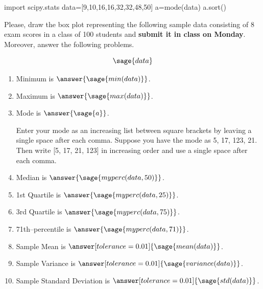 \documentclass{ximera}
\begin{document}
\begin{problem}
\begin{sagesilent}
import scipy.stats
data=[9,10,16,16,32,32,48,50]
a=mode(data)
a.sort()
\end{sagesilent}
Please, draw the box plot representing the following sample data consisting of 8 exam scores in a class of 100 students and \textbf{submit it in class on Monday}. Moreover, answer the following problems.

$$\sage{data}$$


\begin{enumerate}
    \item Minimum is $\answer{\sage{min(data)}}$.
    \item Maximum is $\answer{\sage{max(data)}}$.
    \item Mode is $\answer{\sage{a}}$.
        \begin{hint}
        Enter your mode as an increasing list between square brackets by leaving a single space after each comma. 
        Suppose you have the mode as 5, 17, 123, 21. Then write {\color{red}[5, 17, 21, 123]} in increasing         order and use a single space after each comma.
        \end{hint}
    \item Median is $\answer{\sage{myperc(data,50)}}$.
    \item 1st Quartile is $\answer{\sage{myperc(data,25)}}$.
    \item 3rd Quartile is $\answer{\sage{myperc(data,75)}}$.
    \item 71th--percentile is $\answer{\sage{myperc(data,71)}}$.
    \item Sample Mean is $\answer[tolerance=0.01]{\sage{mean(data)}}$.
    \item Sample Variance is $\answer[tolerance=0.01]{\sage{variance(data)}}$.
    \item Sample Standard Deviation is $\answer[tolerance=0.01]{\sage{std(data)}}$.
\end{enumerate}
\end{problem}
\end{document}
